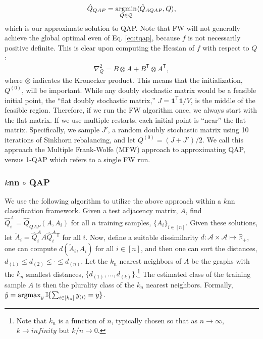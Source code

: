 \documentclass{article} %
\providecommand{\ve}[1]{\boldsymbol{#1}}
\newcommand{\argmax}{\operatornamewithlimits{argmax}}
\newcommand{\argmin}{\operatornamewithlimits{argmin}}
\newcommand{\T}{^{\ensuremath{\mathsf{T}}}}           %
\newcommand{\II}{\mathbb{I}}           %
\providecommand{\mc}[1]{\mathcal{#1}}
\providecommand{\mh}[1]{\hat{#1}}
\providecommand{\mt}[1]{\widetilde{#1}}
\newcommand{\Real}{\mathbb{R}}
\newcommand{\conv}{\rightarrow}
\begin{document}
\begin{align}
	\mh{Q}_{QAP} = \argmin_{Q \in \mc{Q}} \langle \mh{Q}_{AQAP}, Q \rangle,
\end{align}
which is our approximate solution to QAP.  Note that FW will not generally achieve the global optimal even of Eq. \eqref{eq:tqap}, because $f$ is not necessarily positive definite.  This is clear upon computing the Hessian of $f$  with respect to $Q$:
\begin{align}
	\nabla_Q^2  =  B \otimes A + B\T \otimes A\T,
\end{align}
where $\otimes$ indicates the Kronecker product. This means that the initialization, $Q^{(0)}$, will be important.  While any doubly stochastic matrix would be a feasible initial point,  the ``flat doubly  stochastic matrix,'' $J=\ve{1}\T \ve{1}/V$, is the middle of the feasible region.  Therefore, if we run the FW algorithm once, we always start with the flat matrix.  If we use multiple restarts, each initial point is ``near'' the flat matrix.  Specifically, we sample $J'$, a random doubly stochastic matrix using 10 iterations of Sinkhorn rebalancing, and let $Q^{(0)}=(J+J')/2$.  We call this approach the Multiple Frank-Wolfe (MFW) approach to approximating QAP, versus 1-QAP which refers to a single FW run.



\subsubsection{$k$nn $\circ$ QAP} %
\label{ssub:_k_nn_circ_qap}


We use the following algorithm to utilize the above approach within a $k$nn classification framework.  Given a test adjacency matrix, $A$, find $\mh{Q}_i^A=\mh{Q}_{QAP}(A,A_i)$ for all $n$ training samples, $\{A_i\}_{i \in [n]}$.  Given these solutions, let $\mt{A}_i=\mh{Q}_i^A A {\mh{Q}_i^A}{}\T$ for all $i$. Now, define a suitable dissimilarity $d: \mc{A} \times \mc{A} \mapsto \Real_+$, one can compute $d(\mt{A}_i,A_i)$ for all $i \in [n]$, and then one can sort the distances, $d_{(1)} \leq d_{(2)} \leq \cdot \leq d_{(n)}$.  Let the $k_n$ nearest neighbors of $A$ be the graphs with the $k_n$ smallest distances, $\{d_{(1)},\ldots, d_{(k)}\}$.\footnote{Note that $k_n$ is a function of $n$, typically chosen so that as $n \conv \infty$, $k \conv infinity$ but $k/n \conv 0$.}  The estimated class of the training sample $A$ is then the plurality class of the $k_n$ nearest neighbors.  Formally, $\mh{y}=\argmax_{y} \II\{\sum_{i \in [k_n]} y_{(i)} = y \}$.
\end{document}
